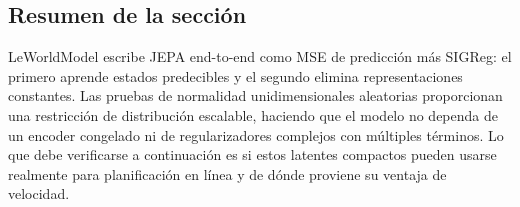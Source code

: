 \subsection{Resumen de la sección}

LeWorldModel escribe JEPA end-to-end como MSE de predicción más SIGReg: el primero aprende estados predecibles y el segundo elimina representaciones constantes. Las pruebas de normalidad unidimensionales aleatorias proporcionan una restricción de distribución escalable, haciendo que el modelo no dependa de un encoder congelado ni de regularizadores complejos con múltiples términos. Lo que debe verificarse a continuación es si estos latentes compactos pueden usarse realmente para planificación en línea y de dónde proviene su ventaja de velocidad.
